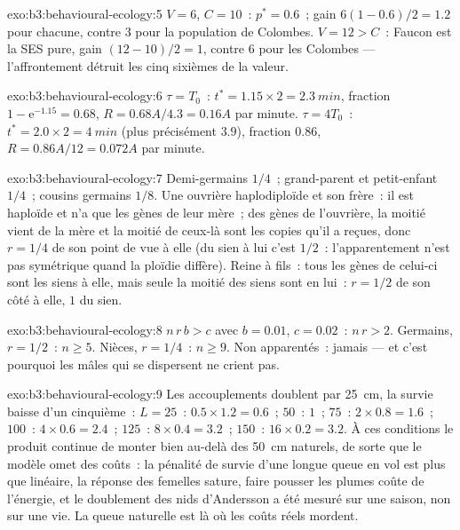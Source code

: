 \begin{solution}{exo:b3:behavioural-ecology:5}
$V = 6$, $C = 10$~: $p^{*} = 0.6$~; gain $6(1 - 0.6)/2 = 1.2$ pour
chacune, contre $3$ pour la population de Colombes. $V = 12 > C$~: Faucon
est la SES pure, gain $(12 - 10)/2 = 1$, contre $6$ pour les Colombes
--- l'affrontement détruit les cinq sixièmes de la valeur.
\end{solution}

\begin{solution}{exo:b3:behavioural-ecology:6}
$\tau = T_{0}$~: $t^{*} = 1.15\times 2 = \qty{2.3}{min}$, fraction $1 -
\mathrm{e}^{-1.15} = 0.68$, $R = 0.68A/4.3 = 0.16A$ par minute. $\tau =
4T_{0}$~: $t^{*} = 2.0\times 2 = \qty{4}{min}$ (plus précisément $3.9$),
fraction $0.86$, $R = 0.86A/12 = 0.072A$ par minute.
\end{solution}

\begin{solution}{exo:b3:behavioural-ecology:7}
Demi-germains $1/4$~; grand-parent et petit-enfant $1/4$~; cousins
germains $1/8$. Une ouvrière haplodiploïde et son frère~: il est haploïde
et n'a que les gènes de leur mère~; des gènes de l'ouvrière, la moitié
vient de la mère et la moitié de ceux-là sont les copies qu'il a reçues,
donc $r = 1/4$ de son point de vue à elle (du sien à lui c'est $1/2$~:
l'apparentement n'est pas symétrique quand la ploïdie diffère). Reine à
fils~: tous les gènes de celui-ci sont les siens à elle, mais seule la
moitié des siens sont en lui~: $r = 1/2$ de son côté à elle, $1$ du sien.
\end{solution}

\begin{solution}{exo:b3:behavioural-ecology:8}
$n\,r\,b > c$ avec $b = 0.01$, $c = 0.02$~: $n\,r > 2$. Germains, $r
= 1/2$~: $n \ge 5$. Nièces, $r = 1/4$~: $n \ge 9$. Non apparentés~:
jamais --- et c'est pourquoi les mâles qui se dispersent ne crient pas.
\end{solution}

\begin{solution}{exo:b3:behavioural-ecology:9}
Les accouplements doublent par \qty{25}{cm}, la survie baisse d'un
cinquième~: $L = 25$~: $0.5\times 1.2 = 0.6$~; $50$~: $1$~; $75$~:
$2\times 0.8 = 1.6$~; $100$~: $4\times 0.6 = 2.4$~; $125$~:
$8\times 0.4 = 3.2$~; $150$~: $16\times 0.2 =
3.2$. À ces conditions le produit continue de monter bien au-delà des
\qty{50}{cm} naturels, de sorte que le modèle omet des coûts~: la
pénalité de survie d'une longue queue en vol est plus que linéaire, la
réponse des femelles sature, faire pousser les plumes coûte de
l'énergie, et le doublement des nids d'Andersson a été mesuré sur une
saison, non sur une vie. La queue naturelle est là où les coûts réels
mordent.
\end{solution}

